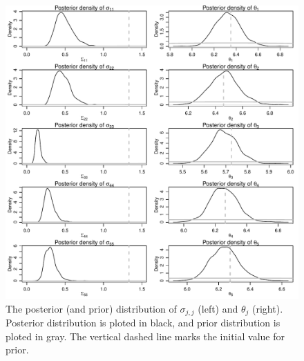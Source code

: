 \documentclass[12pt]{article}
\begin{document}
\begin{figure}[htbp]
	\centering
	\includegraphics[width=.9\textwidth]{pic/0.20/Posterior_vs_Prior.pdf}
	\caption{The posterior (and prior) distribution of $\sigma_{j, j}$ (left) and $\theta_j$ (right). Posterior distribution is ploted in black, and prior distribution is ploted in gray. The vertical dashed line marks the initial value for prior.}
	\label{fig:0.20-Posterior_vs_Prior}
\end{figure}

\newpage
\end{document}
